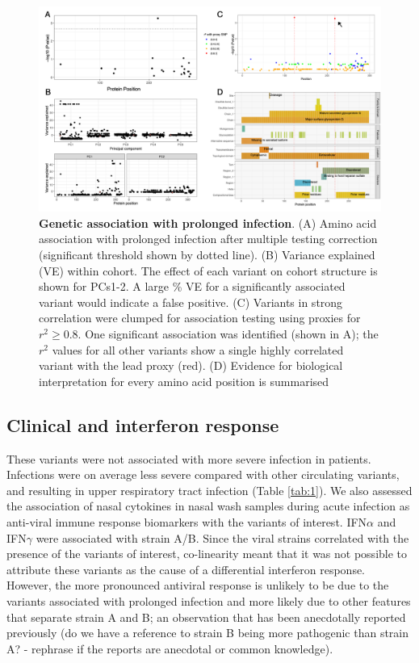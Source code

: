 \documentclass{article} %
\begin{document}
\begin{figure}[ht] \hspace{-0.5cm} 
    \includegraphics[scale=0.85]{f3}
	\caption{\textbf{Genetic association with prolonged infection}. (A) Amino acid association with prolonged infection after multiple testing correction (significant threshold shown by dotted line). (B) Variance explained (VE) within cohort. The effect of each variant on cohort structure is shown for PCs1-2. A large \% VE for a significantly associated variant would indicate a false positive. (C) Variants in strong correlation were clumped for association testing using proxies for $r^2 \ge 0.8$. One significant association was identified (shown in A); the $r^2$ values for all other variants show a single highly correlated variant with the lead proxy (red). 
	(D) Evidence for biological interpretation for every amino acid position is summarised}
	\label{fig:3}
\end{figure}
\clearpage

\subsection{Clinical and interferon response}
These variants were not associated with more severe infection in patients. 
Infections were on average less severe compared with other circulating variants, and resulting in upper respiratory tract infection (Table \ref{tab:1}). 
We also assessed the association of nasal cytokines in nasal wash samples during acute infection as anti-viral immune response biomarkers with the variants of interest.
IFN$\alpha$ and IFN$\gamma$ were associated with strain A/B.
Since the viral strains correlated with the presence of the variants of interest, co-linearity meant that it was not possible to attribute these variants as the cause of a differential interferon response.
However, the more pronounced antiviral response is unlikely to be due to the variants associated with prolonged infection and more likely due to other features that separate strain A and B; an observation that has been anecdotally reported previously 
(do we have a reference to strain B being more pathogenic than strain A? - rephrase if the reports are anecdotal or common knowledge). 
\end{document}
